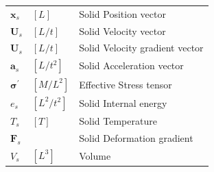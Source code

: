 \documentclass[preprint,12pt]{elsarticle}
\begin{document}
\begin{tabular}{lll}
$\pmb{x}_s$   			&  	$[L]$    	& Solid Position vector\\
$\pmb{U}_s$   			&  	$[L/t]$    	& Solid Velocity vector\\
$\pmb{U}_s$   			&  	$[L/t]$    	& Solid Velocity gradient vector\\
$\pmb{a}_s$   			&  	$[L/t^2]$   & Solid Acceleration vector\\
$\pmb{\sigma}^\prime$ 	&  $[M/L^2]$ 	& Effective Stress tensor\\
$e_s$         			&  $[L^2/t^2]$  & Solid Internal energy \\   
$T_s$           		&  $[T]$      	& Solid Temperature\\
$\pmb{F}_s$     		&       	    & Solid Deformation gradient\\
$V_s$     				&  $[L^3]$      & Volume\\
\end{tabular}
\end{document}
